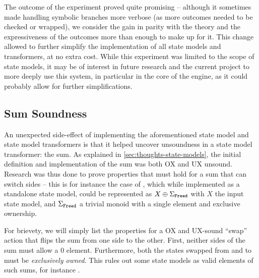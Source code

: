 The outcome of the experiment proved quite promising -- although it sometimes made handling symbolic branches more verbose (as more outcomes needed to be checked or wrapped), we consider the gain in parity with the theory and the expressiveness of the outcomes more than enough to make up for it. This change allowed to further simplify the implementation of all state models and transformers, at no extra cost. While this experiment was limited to the scope of state models, it may be of interest in future research and the current project to more deeply use this system, in particular in the core of the engine, as it could probably allow for further simplifications.

\subsection{Sum Soundness}

An unexpected side-effect of implementing the aforementioned state model and state model transformers is that it helped uncover unsoundness in a state model transformer: the sum. As explained in \autoref{sec:thoughts-state-models}, the initial definition and implementation of the sum was both OX and UX unsound. Research was thus done to prove properties that must hold for a sum that can switch sides -- this is for instance the case of , which while implemented as a standalone state model, could be represented as $X \oplus \Sigma_{\texttt{Freed}}$ with $X$ the input state model, and $\Sigma_{\texttt{Freed}}$ a trivial monoid with a single  element and exclusive ownership.

For brievety, we will simply list the properties for a OX and UX-sound ``swap'' action that flips the sum from one side to the other. First, neither sides of the sum must allow a $0$ element. Furthermore, both the states swapped from and to must be \emph{exclusively owned}. This rules out some state models as valid elements of such sums, for instance .











